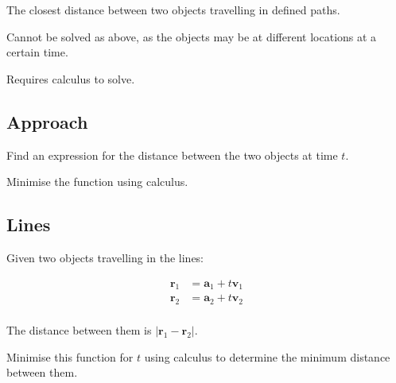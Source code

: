 \documentclass[a4paper,11pt]{article}
\newcommand{\bb}{\boldsymbol}
\begin{document}
The closest distance between two objects travelling in defined paths.

Cannot be solved as above, as the objects may be at different locations at a
certain time.

Requires calculus to solve.


\subsection{Approach}

Find an expression for the distance between the two objects at time $t$.

Minimise the function using calculus.


\subsection{Lines}

Given two objects travelling in the lines:

$$
\begin{aligned}
\bb{r}_1 & = \bb{a}_1 + t \bb{v}_1 \\
\bb{r}_2 & = \bb{a}_2 + t \bb{v}_2 \\
\end{aligned}
$$

The distance between them is $\lvert \bb{r}_1 - \bb{r}_2 \rvert$.

Minimise this function for $t$ using calculus to determine the minimum distance
between them.
\end{document}
